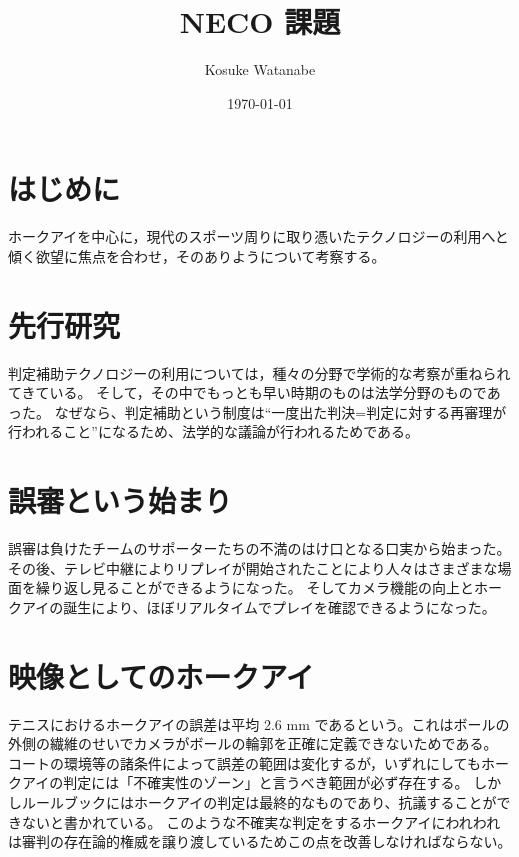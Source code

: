 \documentclass[twocolumn, a4j]{article}
\title{NECO 課題}
\author{Kosuke Watanabe\footnotemark[2]　}
\date{\today}
\renewcommand{\thefootnote}{\fnsymbol{footnote}}
\renewcommand{\thefootnote}{\arabic{footnote}}
\begin{document}

\renewcommand{\thefootnote}{\fnsymbol{footnote}}
\renewcommand{\thefootnote}{\arabic{footnote}}

\section{はじめに}

 ホークアイを中心に，現代のスポーツ周りに取り憑いたテクノロジーの利用へと傾く欲望に焦点を合わせ，そのありようについて考察する。

\section{先行研究}
判定補助テクノロジーの利用については，種々の分野で学術的な考察が重ねられてきている。 そして，その中でもっとも早い時期のものは法学分野のものであった。
なぜなら、判定補助という制度は“一度出た判決=判定に対する再審理が行われること”になるため、法学的な議論が行われるためである。

\section{誤審という始まり}
誤審は負けたチームのサポーターたちの不満のはけ口となる口実から始まった。
その後、テレビ中継によりリプレイが開始されたことにより人々はさまざまな場面を繰り返し見ることができるようになった。
そしてカメラ機能の向上とホークアイの誕生により、ほぼリアルタイムでプレイを確認できるようになった。

\section{映像としてのホークアイ}
テニスにおけるホークアイの誤差は平均 2.6 mm であるという。これはボールの外側の繊維のせいでカメラがボールの輪郭を正確に定義できないためである。
コートの環境等の諸条件によって誤差の範囲は変化するが，いずれにしてもホークアイの判定には「不確実性のゾーン」と言うべき範囲が必ず存在する。
しかしルールブックにはホークアイの判定は最終的なものであり、抗議することができないと書かれている。
このような不確実な判定をするホークアイにわれわれは審判の存在論的権威を譲り渡しているためこの点を改善しなければならない。
\end{document}

